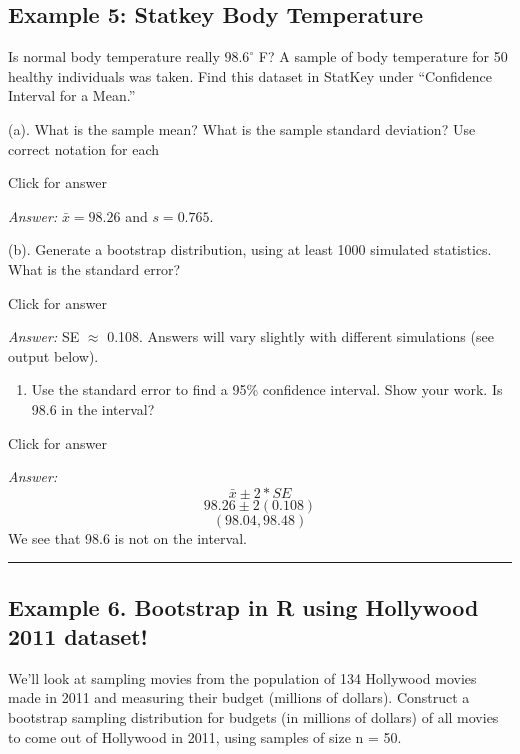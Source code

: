 \documentclass[
]{book}
\providecommand{\tightlist}{%
  \setlength{\itemsep}{0pt}\setlength{\parskip}{0pt}}
\begin{document}
\hypertarget{example-5-statkey-body-temperature}{%
\subsection{Example 5: Statkey Body Temperature}\label{example-5-statkey-body-temperature}}

Is normal body temperature really \(98.6^{\circ}\) F? A sample of body temperature for 50 healthy individuals was taken. Find this dataset in StatKey under ``Confidence Interval for a Mean.''

(a). What is the sample mean? What is the sample standard deviation? Use correct notation for each

Click for answer

\emph{Answer:} \(\bar{x} = 98.26\) and \(s = 0.765\).

(b). Generate a bootstrap distribution, using at least 1000 simulated statistics. What is the standard
error?

Click for answer

\emph{Answer:} SE \(\approx\) 0.108. Answers will vary slightly with different simulations (see output below).

\begin{enumerate}
\def\labelenumi{(\alph{enumi})}
\setcounter{enumi}{2}
\tightlist
\item
  Use the standard error to find a 95\% confidence interval. Show your work. Is 98.6 in the interval?
\end{enumerate}

Click for answer

\emph{Answer:} \[ \bar{x} \pm 2*SE\]
\[98.26 \pm 2(0.108) \]
\[(98.04, 98.48) \]
We see that 98.6 is not on the interval.

\vspace*{1.5in}

\begin{center}\rule{0.5\linewidth}{0.5pt}\end{center}

\hypertarget{example-6.-bootstrap-in-r-using-hollywood-2011-dataset}{%
\subsection{Example 6. Bootstrap in R using Hollywood 2011 dataset!}\label{example-6.-bootstrap-in-r-using-hollywood-2011-dataset}}

We'll look at sampling movies from the population of 134 Hollywood movies made in 2011 and measuring their budget (millions of dollars). Construct a bootstrap sampling distribution for budgets (in millions of dollars) of all movies to come out of Hollywood in 2011, using samples of size n = 50.
\end{document}
